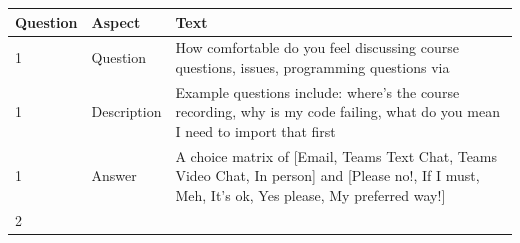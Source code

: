 \documentclass[paper=a4,justified,a4paper]{tufte-handout}
\begin{document}
\begin{longtable}[]{@{}lll@{}}
\toprule
\begin{minipage}[b]{0.09\columnwidth}\raggedright
Question\strut
\end{minipage} & \begin{minipage}[b]{0.14\columnwidth}\raggedright
Aspect\strut
\end{minipage} & \begin{minipage}[b]{0.68\columnwidth}\raggedright
Text\strut
\end{minipage}\tabularnewline
\midrule
\endhead
\begin{minipage}[t]{0.09\columnwidth}\raggedright
1\strut
\end{minipage} & \begin{minipage}[t]{0.14\columnwidth}\raggedright
Question\strut
\end{minipage} & \begin{minipage}[t]{0.68\columnwidth}\raggedright
How comfortable do you feel discussing course questions, issues,
programming questions via\strut
\end{minipage}\tabularnewline
\begin{minipage}[t]{0.09\columnwidth}\raggedright
1\strut
\end{minipage} & \begin{minipage}[t]{0.14\columnwidth}\raggedright
Description\strut
\end{minipage} & \begin{minipage}[t]{0.68\columnwidth}\raggedright
Example questions include: where's the course recording, why is my code
failing, what do you mean I need to import that first\strut
\end{minipage}\tabularnewline
\begin{minipage}[t]{0.09\columnwidth}\raggedright
1\strut
\end{minipage} & \begin{minipage}[t]{0.14\columnwidth}\raggedright
Answer\strut
\end{minipage} & \begin{minipage}[t]{0.68\columnwidth}\raggedright
A choice matrix of {[}Email, Teams Text Chat, Teams Video Chat, In
person{]} and {[}Please no!, If I must, Meh, It's ok, Yes please, My
preferred way!{]}\strut
\end{minipage}\tabularnewline
\begin{minipage}[t]{0.09\columnwidth}\raggedright
2\strut
\end{minipage} & \begin{minipage}[t]{0.14\columnwidth}\raggedright

\end{minipage}
\end{longtable}
\end{document}
